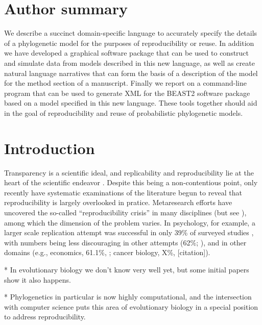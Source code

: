 \documentclass[10pt,letterpaper,table]{article}
\begin{document}
\section*{Author summary}
  We describe a succinct domain-specific language to accurately specify the details of a phylogenetic model for the purposes of reproducibility or reuse.
  In addition we have developed a graphical software package that can be used to construct and simulate data from models described in this new language, as well as create natural language narratives that can form the basis of a description of the model for the method section of a manuscript.
  Finally we report on a command-line program that can be used to generate XML for the BEAST2 software package based on a model specified in this new language.
  These tools together should aid in the goal of reproducibility and reuse of probabilistic phylogenetic models.


\linenumbers

\section*{Introduction}

Transparency is a scientific ideal, and replicability and
reproducibility lie at the heart of the scientific endeavor
\cite{nas19,munafo17}.
Despite this being a non-contentious point, only recently have
systematic examinations of the literature begun to reveal that
reproducibility is largely overlooked in pratice.
Metaresearch efforts have uncovered the so-called ``reproducibility
crisis'' \cite{baker16} in many disciplines (but see
\cite{fanneli18}), among which the dimension of the problem varies.
In psychology, for example, a larger scale replication attempt was
successful in only 39\% of surveyed studies \cite{openscience15},
with numbers being less discouraging in other attempts (62\%;
\cite{camerer18}), and in other domains (e.g., economics, 61.1\%,
\cite{camerer16}; cancer biology, X\%, [citation]).

* In evolutionary biology we don't know very well yet, but some
initial papers show it also happens.

* Phylogenetics in particular is now highly computational, and the
intersection with computer science puts this area of evolutionary
biology in a special position to address reproducibility.
\end{document}
